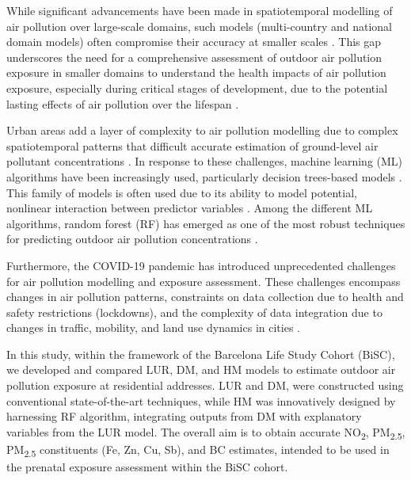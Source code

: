 \documentclass{article}
\begin{document}
While significant advancements have been made in spatiotemporal modelling of air pollution over large-scale domains, such models (multi-country and national domain models) often compromise their accuracy at smaller scales \cite{dehoogh2016, chen2019, chen2020, shen2022}. This gap underscores the need for a comprehensive assessment of outdoor air pollution exposure in smaller domains to understand the health impacts of air pollution exposure, especially during critical stages of development, due to the potential lasting effects of air pollution over the lifespan \cite{selevan2000, wick2010, ghosh2021}. 

Urban areas add a layer of complexity to air pollution modelling due to complex spatiotemporal patterns that difficult accurate estimation of ground-level air pollutant concentrations \cite{sokhi2022}. In response to these challenges, machine learning (ML) algorithms have been increasingly used, particularly decision trees-based models \cite{liu2022}. This family of models is often used due to its ability to model potential, nonlinear interaction between predictor variables \cite{liu2022treebased}. Among the different ML algorithms, random forest (RF) has emerged as one of the most robust techniques for predicting outdoor air pollution concentrations \cite{chen2019, chen2020, stafoggia2019, stafoggia2020, schneider2020, mila2023}.

Furthermore, the COVID-19 pandemic has introduced unprecedented challenges for air pollution modelling and exposure assessment. These challenges encompass changes in air pollution patterns, constraints on data collection due to health and safety restrictions (lockdowns), and the complexity of data integration due to changes in traffic, mobility, and land use dynamics in cities \cite{gonzalez2022, querol2021}. 
 
In this study, within the framework of the Barcelona Life Study Cohort (BiSC), we developed and compared LUR, DM, and HM models to estimate outdoor air pollution exposure at residential addresses. LUR and DM, were constructed using conventional state-of-the-art techniques, while HM was innovatively designed by harnessing RF algorithm, integrating outputs from DM with explanatory variables from the LUR model. The overall aim is to obtain accurate NO\textsubscript{2}, PM\textsubscript{2.5}, PM\textsubscript{2.5} constituents (Fe, Zn, Cu, Sb), and BC estimates, intended to be used in the prenatal exposure assessment within the BiSC cohort. 

\end{document}
